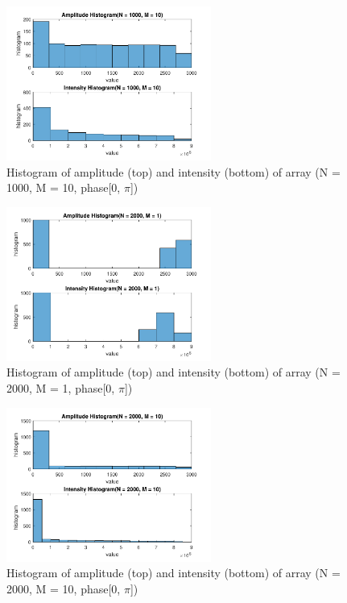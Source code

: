 \documentclass{article}
\begin{document}
\begin{figure}[H]
	\centering
	\includegraphics[width = 0.6\textwidth]{src/pi/hist_1000_10.pdf}
	\caption{Histogram of amplitude (top) and intensity (bottom) of array (N = 1000, M = 10, phase[0, $\pi$])}
	\label{fig:hist-1000-10-pi}
\end{figure}
\begin{figure}[H]
	\centering
	\includegraphics[width = 0.6\textwidth]{src/pi/hist_2000_1.pdf}
	\caption{Histogram of amplitude (top) and intensity (bottom) of array (N = 2000, M = 1, phase[0, $\pi$])}
	\label{fig:hist-2000-1-pi}
\end{figure}
\begin{figure}[H]
	\centering
	\includegraphics[width = 0.6\textwidth]{src/pi/hist_2000_10.pdf}
	\caption{Histogram of amplitude (top) and intensity (bottom) of array (N = 2000, M = 10, phase[0, $\pi$])}
	\label{fig:hist-2000-10-pi}
\end{figure}
\end{document}
